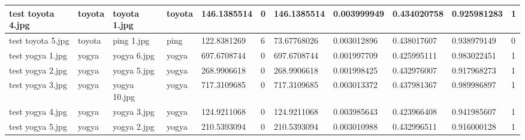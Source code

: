 \begin{landscape}
\begin{longtable}{|p{2cm}|p{1.5cm}|p{2cm}|p{1.5cm}|p{2cm}|p{1cm}|p{2cm}|p{2cm}|p{2cm}|p{2cm}|p{1cm}|}
		test toyota 4.jpg    & toyota           & toyota 1.jpg          & toyota                      & 146.1385514           & 0                       & 146.1385514                & 0.003999949           & 0.434020758           & 0.925981283              & 1                \\ \hline
		test toyota 5.jpg    & toyota           & ping 1.jpg            & ping                        & 122.8381269           & 6                       & 73.67768026                & 0.003012896           & 0.438017607           & 0.938979149              & 0                \\ \hline
		test yogya 1.jpg     & yogya            & yogya 6.jpg           & yogya                       & 697.6708744           & 0                       & 697.6708744                & 0.001997709           & 0.425995111           & 0.983022451              & 1                \\ \hline
		test yogya 2.jpg     & yogya            & yogya 5.jpg           & yogya                       & 268.9906618           & 0                       & 268.9906618                & 0.001998425           & 0.432976007           & 0.917968273              & 1                \\ \hline
		test yogya 3.jpg     & yogya            & yogya 10.jpg          & yogya                       & 717.3109685           & 0                       & 717.3109685                & 0.003013372           & 0.437981367           & 0.989986897              & 1                \\ \hline
		test yogya 4.jpg     & yogya            & yogya 3.jpg           & yogya                       & 124.9211068           & 0                       & 124.9211068                & 0.003985643           & 0.423966408           & 0.941985607              & 1                \\ \hline
		test yogya 5.jpg     & yogya            & yogya 2.jpg           & yogya                       & 210.5393094           & 0                       & 210.5393094                & 0.003010988           & 0.432996511           & 0.916000128              & 1                \\ \hline
	\end{longtable}
\end{landscape}

